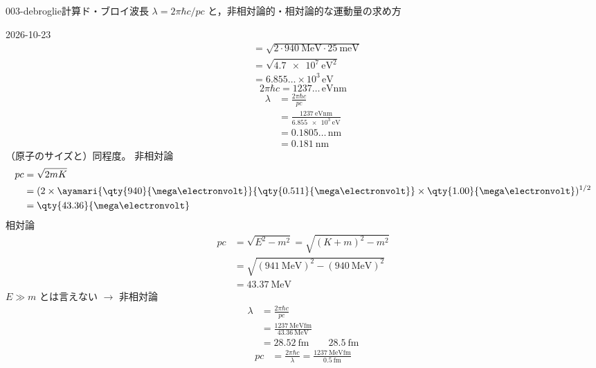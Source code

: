 \documentclass[uplatex,dvipdfmx,a4paper,11pt]{jsarticle}
\begin{document}
\begin{mondai}{003-debroglie}{計算}{ド・ブロイ波長 $\lambda=2\pi\hbar c/pc$ と，非相対論的・相対論的な運動量の求め方}
\begin{kotaeutsushi}{2026-10-23}
\begin{align*}
  &=\sqrt{2\cdot\qty{940}{\mega\electronvolt}\cdot\qty{25}{\milli\electronvolt}}\\
  &=\sqrt{\qty{4.7e7}{\electronvolt\squared}}\\
  &=6.855\ldots\times10^{3}\,\unit{\electronvolt}
\end{align*}
\[ 2\pi\hbar c=1237\ldots\,\unit{\electronvolt\nano\metre} \]
\begin{align*}
  \lambda&=\frac{2\pi\hbar c}{pc}\\
  &=\frac{\qty{1237}{\electronvolt\nano\metre}}{\qty{6.855e3}{\electronvolt}}\\
  &=0.1805\ldots\,\unit{\nano\metre}\\
  &=\qty{0.181}{\nano\metre}
\end{align*}
（原子のサイズと）同程度。
非相対論
\begin{align*}
  pc&=\sqrt{2mK}\\
  &=(2\times\ayamari{\qty{940}{\mega\electronvolt}}{\qty{0.511}{\mega\electronvolt}}\times\qty{1.00}{\mega\electronvolt})^{1/2}\\
  &=\qty{43.36}{\mega\electronvolt}
\end{align*}
相対論
\begin{align*}
  pc&=\sqrt{E^{2}-m^{2}}=\sqrt{(K+m)^{2}-m^{2}}\\
  &=\sqrt{(\qty{941}{\mega\electronvolt})^{2}-(\qty{940}{\mega\electronvolt})^{2}}\\
  &=\qty{43.37}{\mega\electronvolt}
\end{align*}
$E\gg m$ とは言えない $\to$ 非相対論
\begin{align*}
  \lambda&=\frac{2\pi\hbar c}{pc}\\
  &=\frac{\qty{1237}{\mega\electronvolt\femto\metre}}{\qty{43.36}{\mega\electronvolt}}\\
  &=\qty{28.52}{\femto\metre}\qquad\qty{28.5}{\femto\metre}
\end{align*}
\begin{align*}
  pc&=\frac{2\pi\hbar c}{\lambda}=\frac{\qty{1237}{\mega\electronvolt\femto\metre}}{\qty{0.5}{\femto\metre}}\\

\end{align*}
\end{kotaeutsushi}
\end{mondai}
\end{document}
